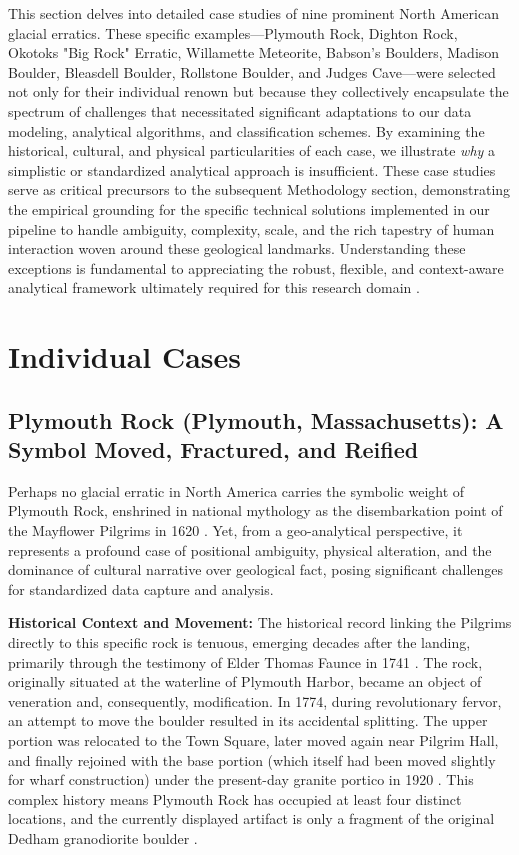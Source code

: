 This section delves into detailed case studies of nine prominent North American glacial erratics. These specific examples—Plymouth Rock, Dighton Rock, Okotoks "Big Rock" Erratic, Willamette Meteorite, Babson's Boulders, Madison Boulder, Bleasdell Boulder, Rollstone Boulder, and Judges Cave—were selected not only for their individual renown but because they collectively encapsulate the spectrum of challenges that necessitated significant adaptations to our data modeling, analytical algorithms, and classification schemes. By examining the historical, cultural, and physical particularities of each case, we illustrate \emph{why} a simplistic or standardized analytical approach is insufficient. These case studies serve as critical precursors to the subsequent Methodology section, demonstrating the empirical grounding for the specific technical solutions implemented in our pipeline to handle ambiguity, complexity, scale, and the rich tapestry of human interaction woven around these geological landmarks. Understanding these exceptions is fundamental to appreciating the robust, flexible, and context-aware analytical framework ultimately required for this research domain \cite{Cuffey2010, Delcourt1991}.

\section{Individual Cases}
\label{sec:individual_cases}

\subsection{Plymouth Rock (Plymouth, Massachusetts): A Symbol Moved, Fractured, and Reified}
\label{subsec:plymouth}

Perhaps no glacial erratic in North America carries the symbolic weight of Plymouth Rock, enshrined in national mythology as the disembarkation point of the Mayflower Pilgrims in 1620 \cite{Seelye1997}. Yet, from a geo-analytical perspective, it represents a profound case of positional ambiguity, physical alteration, and the dominance of cultural narrative over geological fact, posing significant challenges for standardized data capture and analysis.

\textbf{Historical Context and Movement:} The historical record linking the Pilgrims directly to this specific rock is tenuous, emerging decades after the landing, primarily through the testimony of Elder Thomas Faunce in 1741 \cite{Seelye1997}. The rock, originally situated at the waterline of Plymouth Harbor, became an object of veneration and, consequently, modification. In 1774, during revolutionary fervor, an attempt to move the boulder resulted in its accidental splitting. The upper portion was relocated to the Town Square, later moved again near Pilgrim Hall, and finally rejoined with the base portion (which itself had been moved slightly for wharf construction) under the present-day granite portico in 1920 \cite{Seelye1997}. This complex history means Plymouth Rock has occupied at least four distinct locations, and the currently displayed artifact is only a fragment of the original Dedham granodiorite boulder \cite{Emerson1917}.

